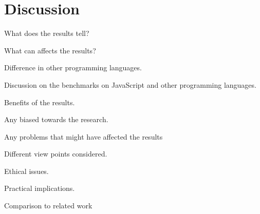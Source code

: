 \chapter{Discussion\label{discussion}}
What does the results tell?

What can affects the results?

Difference in other programming languages.

Discussion on the benchmarks on JavaScript and other programming languages.

Benefits of the results.

Any biased towards the research.

Any problems that might have affected the results

Different view points considered.

Ethical issues.

Practical implications.

Comparison to related work
